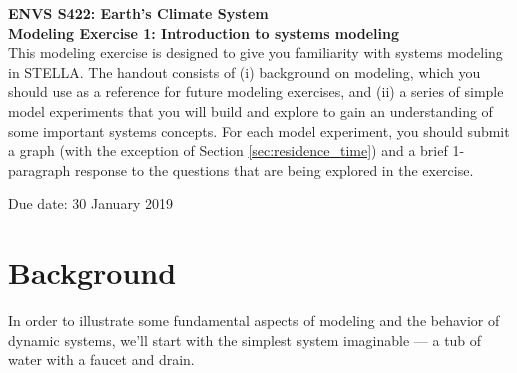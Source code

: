 \documentclass[11pt,letterpaper]{article}
\begin{document}
\textbf{ENVS S422: Earth's Climate System\\
Modeling Exercise 1: Introduction to systems modeling}\\

This modeling exercise is designed to give you familiarity with systems modeling in STELLA. The handout consists of (i) background on modeling, which you should use as a reference for future modeling exercises, and (ii) a series of simple model experiments that you will build and explore to gain an understanding of some important systems concepts. For each model experiment, you should submit a graph (with the exception of Section \ref{sec:residence_time}) and a brief 1-paragraph response to the questions that are being explored in the exercise.

Due date: 30 January 2019

\section{Background}
In order to illustrate some fundamental aspects of modeling and the behavior of dynamic systems, we'll start with the simplest system imaginable --- a tub of water with a faucet and drain.
\end{document}
